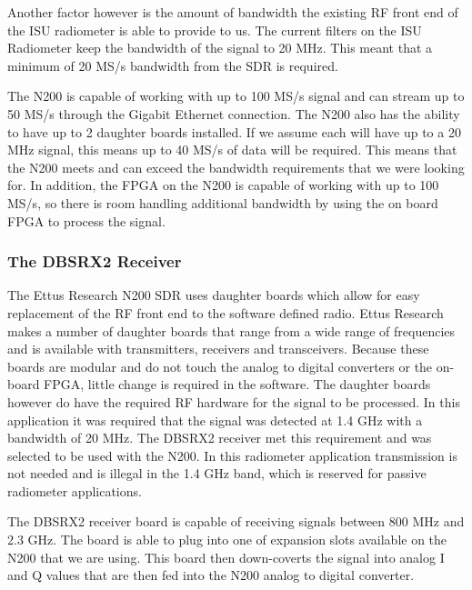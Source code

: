 Another factor however is the amount of bandwidth the existing RF front end of the ISU radiometer is able to provide to us.  The current filters on the ISU Radiometer keep the bandwidth of the signal to 20 MHz.  This meant that a minimum of 20 MS/s bandwidth from the SDR is required.  

The N200 is capable of working with up to 100 MS/s signal and can stream up to 50 MS/s through the Gigabit Ethernet connection.  The N200 also has the ability to have up to 2 daughter boards installed.  If we assume each will have up to a 20 MHz signal, this means up to 40 MS/s of data will be required.  This means that the N200 meets and can exceed the bandwidth requirements that we were looking for.  In addition, the FPGA on the N200 is capable of working with up to 100 MS/s, so there is room handling additional bandwidth by using the on board FPGA to process the signal.

\subsubsection{The DBSRX2 Receiver}

The Ettus Research N200 SDR uses daughter boards which allow for easy replacement of the RF front end to the software defined radio.  Ettus Research makes a number of daughter boards that range from a wide range of frequencies and is available with transmitters, receivers and transceivers.  Because these boards are modular and do not touch the analog to digital converters or the on-board FPGA, little change is required in the software.  The daughter boards however do have the required RF hardware for the signal to be processed.  In this application it was required that the signal was detected at 1.4 GHz with a bandwidth of 20 MHz.  The DBSRX2 receiver met this requirement and was selected to be used with the N200.  In this radiometer application transmission is not needed and is illegal in the 1.4 GHz band, which is reserved for passive radiometer applications.

The DBSRX2 receiver board is capable of receiving signals between 800 MHz and 2.3 GHz.  The board is able to plug into one of expansion slots available on the N200 that we are using.  This board then down-coverts the signal into analog I and Q values that are then fed into the N200 analog to digital converter.

